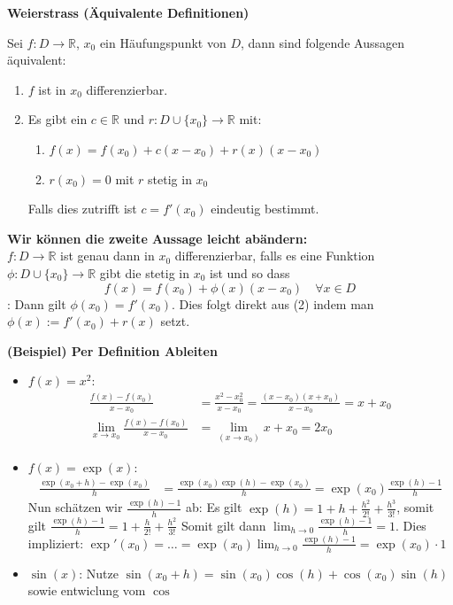 \documentclass[25pt]{sciposter}
\newcommand{\R}{\mathbb{R}}
\newenvironment{method}[1]{\begin{mdframed}[backgroundcolor=blue!10,innertopmargin=15pt, innerbottommargin=15pt, nobreak=true]
		\textbf{#1 }
	}
	{ 
	\end{mdframed}
}
\begin{document}
\begin{multicols}{3}
\begin{method}{Weierstrass (Äquivalente Definitionen)}
Sei $f : D \to \R$, $x_0$ ein Häufungspunkt von $D$, dann sind folgende Aussagen äquivalent:
\begin{enumerate}
	\item $f$ ist in $x_0$ differenzierbar.
	\item Es gibt ein $c\in \R$ und $r : D \cup \{x_0\} \to \R$ mit:
	\begin{enumerate}
		\item $f(x) = f(x_0) + c(x-x_0) + r(x) (x-x_0)$
		\item $r(x_0) = 0$ mit $r$ stetig in $x_0$
	\end{enumerate}
Falls dies zutrifft ist $c=f'(x_0)$ eindeutig bestimmt.
\end{enumerate}

\textbf{Wir können die zweite Aussage leicht abändern:}\\
$f:D \to \R$ ist genau dann in $x_0$ differenzierbar, falls es eine Funktion $\phi : D \cup \{x_0\} \to \R$ gibt die stetig in $x_0$ ist und so dass 
$$f(x) = f(x_0) + \phi(x)(x-x_0) \quad \forall x \in D$$:
Dann gilt $\phi(x_0) = f'(x_0)$. Dies folgt direkt aus (2) indem man $\phi(x) := f'(x_0) + r(x)$ setzt.
\end{method}

\textbf{(Beispiel) Per Definition Ableiten}

\begin{itemize}
	\item $f(x) = x^2$:
	\begin{align*}
		\frac{f(x) - f(x_0)}{x-x_0} &= 	\frac{x^2 - x_{0}^2}{x-x_0} = \frac{(x-x_0) (x+x_0)}{x-x_0} = x + x_0\\
		\lim_{x \to x_0} \frac{f(x)-f(x_0)}{x-x_0} &= \lim_{(x\to x_0)} x + x_0 = 2x_0
	\end{align*}
	
	\item $f(x) = \exp(x)$:
	\begin{align*}
		\frac{\exp(x_0 + h ) - \exp(x_0)}{h} &= \frac{\exp(x_0)\exp(h) -\exp(x_0)}{h} = \exp(x_0) \frac{\exp(h) - 1}{h}
	\end{align*}
	Nun schätzen wir $\frac{\exp(h) - 1}{h}$ ab: Es gilt $\exp(h) = 1 + h + \frac{h^2}{2!} + \frac{h^3}{3!}$, somit gilt 
	$\frac{\exp(h) - 1}{h} = 1 + \frac{h}{2!} + \frac{h^2}{3!}$
	Somit gilt dann $\lim_{h \to 0} \frac{\exp(h) - 1}{h} = 1$. Dies impliziert:
	$\exp'(x_0) = \ldots = \exp(x_0) \lim_{h \to 0} \frac{\exp(h) - 1}{h} = \exp(x_0) \cdot 1$
	\item {\footnotesize $\sin(x)$: Nutze $\sin(x_0 + h ) = \sin(x_0)\cos(h) + \cos(x_0)\sin(h)$ sowie entwiclung vom $\cos$}
\end{itemize}





\end{multicols}
\end{document}
